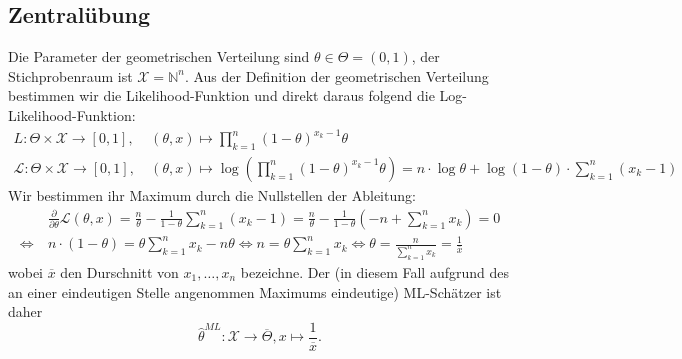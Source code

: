 \documentclass[a4paper]{article}
\begin{document}
\makeexheader

\subsection{Zentralübung}

Die Parameter der geometrischen Verteilung sind $\theta \in \Theta = (0,1)$, der Stichprobenraum ist $\mathcal{X} = \mathds{N}^n$.
Aus der Definition der geometrischen Verteilung bestimmen wir die Likelihood-Funktion und direkt daraus folgend die Log-Likelihood-Funktion:
\begin{align*}
    L: \Theta \times \mathcal{X} \to [0,1], & \ (\theta, x) \mapsto \prod_{k = 1}^{n} (1-\theta)^{x_k-1} \theta \\ 
    \mathcal{L}: \Theta \times \mathcal{X} \to [0,1], & \ (\theta, x) \mapsto \log\left(\prod_{k = 1}^{n} (1-\theta)^{x_k-1} \theta\right) = n \cdot \log \theta + \log (1-\theta) \cdot \sum_{k = 1}^{n}(x_k-1) 
\end{align*}
Wir bestimmen ihr Maximum durch die Nullstellen der Ableitung:
\begin{align*}
    &\frac{\partial}{\partial \theta} \mathcal{L}(\theta, x) = \frac{n}{\theta} - \frac{1}{1 - \theta} \sum_{k = 1}^{n}(x_k-1) = \frac{n}{\theta} - \frac{1}{1 - \theta} \left(-n + \sum_{k = 1}^{n} x_k  \right) = 0\\
    \iff \ & n \cdot (1 - \theta) = \theta \sum_{k = 1}^{n}x_k - n \theta \iff n = \theta \sum_{k = 1}^{n}x_k \iff \theta = \frac{n}{\sum_{k = 1}^{n}x_k} = \frac{1}{\overline{x}}
\end{align*}
wobei $\overline{x}$ den Durschnitt von $x_1, \dots, x_n$ bezeichne. Der (in diesem Fall aufgrund des an einer eindeutigen Stelle angenommen Maximums eindeutige) ML-Schätzer ist daher
\begin{equation*}
    \hat{\theta}^{ML}: \mathcal{X} \to \overline{\Theta}, x \mapsto \frac{1}{\overline{x}}\text{.}
\end{equation*}

\subsection{}
\end{document}
